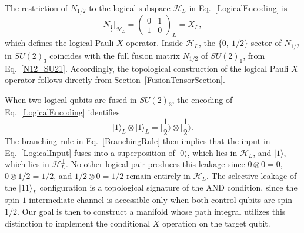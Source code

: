 \documentclass[12pt,a4paper]{article}
\def\ket#1{{|{#1}\rangle}}
\begin{document}
The restriction of $N_{1/2}$ to the logical subspace $\mathcal{H}_L$ in Eq.\ \eqref{LogicalEncoding} is
%
\begin{equation}\label{N12_logical}
N_{\frac{1}{2}}\big|_{\mathcal{H}_L} = 
\begin{pmatrix} 
0 & 1 \\ 
1 & 0 
\end{pmatrix}_L = X_L,
\end{equation}
%
which defines the logical Pauli $X$ operator. Inside $\mathcal{H}_L$, the $\{0,\ 1/2\}$ sector of $N_{1/2}$ in $SU(2)_3$ coincides with the full fusion matrix $N_{1/2}$ of $SU(2)_1$, from Eq.\ \eqref{N12_SU21}. Accordingly, the topological construction of the logical Pauli $X$ operator follows directly from Section~\ref{FusionTensorSection}.

When two logical qubits are fused in $SU(2)_3$, the encoding of Eq.\ \eqref{LogicalEncoding} identifies
%
\begin{equation}\label{LogicalInput}
    \ket{1}_L\otimes\ket{1}_L = \ket{\frac{1}{2}}\otimes\ket{\frac{1}{2}}.
\end{equation}
% 
The branching rule in Eq.\ \eqref{BranchingRule} then implies that the input in Eq.\ \eqref{LogicalInput} fuses into a superposition of $\ket{0}$, which lies in $\mathcal{H}_L$, and $\ket{1}$, which lies in $\mathcal{H}_L^\perp$. No other logical pair produces this leakage since $0\otimes 0 = 0$, $0\otimes 1/2 = 1/2$, and $1/2\otimes 0 = 1/2$ remain entirely in $\mathcal{H}_L$. The selective leakage of the $\ket{11}_L$ configuration is a topological signature of the AND condition, since the spin-$1$ intermediate channel is accessible only when both control qubits are spin-$1/2$. Our goal is then to construct a manifold whose path integral utilizes this distinction to implement the conditional $X$ operation on the target qubit.
\end{document}
